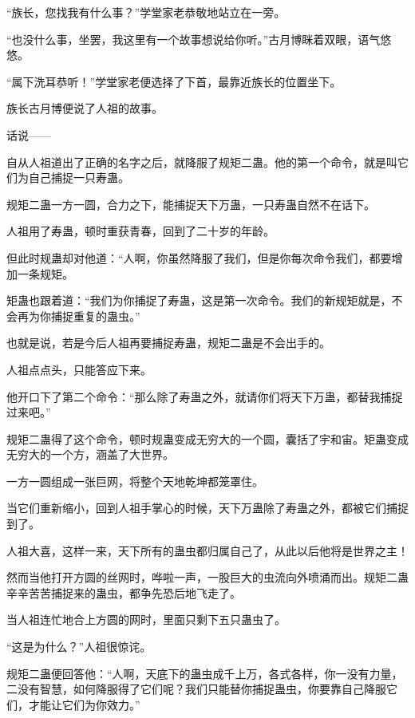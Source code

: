
\begin{this_body}



“族长，您找我有什么事？”学堂家老恭敬地站立在一旁。

“也没什么事，坐罢，我这里有一个故事想说给你听。”古月博眯着双眼，语气悠悠。

“属下洗耳恭听！”学堂家老便选择了下首，最靠近族长的位置坐下。

族长古月博便说了人祖的故事。

话说——

自从人祖道出了正确的名字之后，就降服了规矩二蛊。他的第一个命令，就是叫它们为自己捕捉一只寿蛊。

规矩二蛊一方一圆，合力之下，能捕捉天下万蛊，一只寿蛊自然不在话下。

人祖用了寿蛊，顿时重获青春，回到了二十岁的年龄。

但此时规蛊却对他道：“人啊，你虽然降服了我们，但是你每次命令我们，都要增加一条规矩。

矩蛊也跟着道：“我们为你捕捉了寿蛊，这是第一次命令。我们的新规矩就是，不会再为你捕捉重复的蛊虫。”

也就是说，若是今后人祖再要捕捉寿蛊，规矩二蛊是不会出手的。

人祖点点头，只能答应下来。

他开口下了第二个命令：“那么除了寿蛊之外，就请你们将天下万蛊，都替我捕捉过来吧。”

规矩二蛊得了这个命令，顿时规蛊变成无穷大的一个圆，囊括了宇和宙。矩蛊变成无穷大的一个方，涵盖了大世界。

一方一圆组成一张巨网，将整个天地乾坤都笼罩住。

当它们重新缩小，回到人祖手掌心的时候，天下万蛊除了寿蛊之外，都被它们捕捉到了。

人祖大喜，这样一来，天下所有的蛊虫都归属自己了，从此以后他将是世界之主！

然而当他打开方圆的丝网时，哗啦一声，一股巨大的虫流向外喷涌而出。规矩二蛊辛辛苦苦捕捉来的蛊虫，都争先恐后地飞走了。

当人祖连忙地合上方圆的网时，里面只剩下五只蛊虫了。

“这是为什么？”人祖很惊诧。

规矩二蛊便回答他：“人啊，天底下的蛊虫成千上万，各式各样，你一没有力量，二没有智慧，如何降服得了它们呢？我们只能替你捕捉蛊虫，你要靠自己降服它们，才能让它们为你效力。”


\end{this_body}
